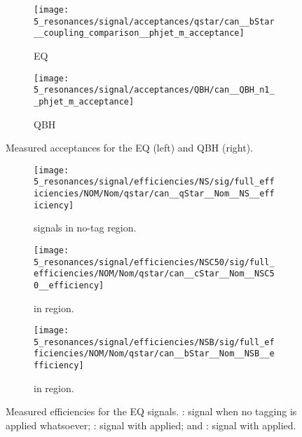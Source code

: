 \begin{figure}[ht!]
    \centering
    \begin{subfigure}[h]{0.49\linewidth}
        \centering
        \texttt{[image: 5\_resonances/signal/acceptances/qstar/can\_\_bStar\_\_coupling\_comparison\_\_phjet\_m\_acceptance]}
        \caption{\ac{EQ}}
        \label{fig:signals:acc_eff:acceptances:qstar}
    \end{subfigure}
    \hfill
    \begin{subfigure}[h]{0.49\linewidth}
        \centering
        \texttt{[image: 5\_resonances/signal/acceptances/QBH/can\_\_QBH\_n1\_\_phjet\_m\_acceptance]}
        \caption{\ac{QBH}}
        \label{fig:signals:acc_eff:acceptances:qbh}
    \end{subfigure}
    \caption{Measured acceptances for the \ac{EQ} (left) and \ac{QBH} (right).}
    \label{fig:signals:acc_eff:acceptances}
\end{figure}

\begin{figure}[ht!]
    \centering
    \begin{subfigure}[h]{0.32\linewidth}
        \centering
        \texttt{[image: 5\_resonances/signal/efficiencies/NS/sig/full\_efficiencies/NOM/Nom/qstar/can\_\_qStar\_\_Nom\_\_NS\_\_efficiency]}
        \caption{\qstar signals in no-tag region.}
        \label{fig:signals:acc_eff:efficiencies:qstar}
    \end{subfigure}
    \hfill
    \begin{subfigure}[h]{0.32\linewidth}
        \centering
        \texttt{[image: 5\_resonances/signal/efficiencies/NSC50/sig/full\_efficiencies/NOM/Nom/qstar/can\_\_cStar\_\_Nom\_\_NSC50\_\_efficiency]}
        \caption{\cstar in \ctagged region.}
        \label{fig:signals:acc_eff:efficiencies:cstar}
    \end{subfigure}
    \hfill
    \begin{subfigure}[h]{0.32\linewidth}
        \centering
        \texttt{[image: 5\_resonances/signal/efficiencies/NSB/sig/full\_efficiencies/NOM/Nom/qstar/can\_\_bStar\_\_Nom\_\_NSB\_\_efficiency]}
        \caption{\bstar in \btagged region.}
        \label{fig:signals:acc_eff:efficiencies:bstar}
    \end{subfigure}
    \caption{Measured efficiencies for the \ac{EQ} signals. : \qstar signal when no tagging is applied whatsoever; : \cstar signal with \ctagging applied; and : \bstar signal with \btagging applied.}
    \label{fig:signals:acc_eff:efficiencies}
\end{figure}







